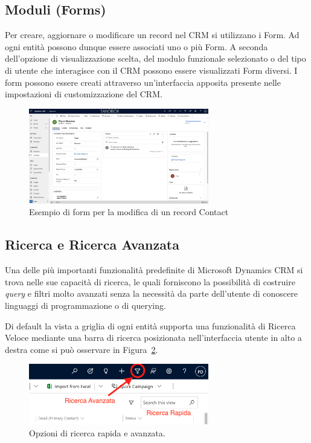 \subsection{Moduli (Forms)}
Per creare, aggiornare o modificare un record nel CRM si utilizzano i Form. Ad ogni entità possono dunque essere associati uno o più Form. A seconda dell'opzione di visualizzazione scelta, del modulo funzionale selezionato o del tipo di utente che interagisce con il CRM possono essere visualizzati Form diversi. 
I form possono essere creati attraverso un'interfaccia apposita presente nelle impostazioni di customizzazione del CRM.
\begin{figure}[ht!]
  \centering
  \includegraphics[width=0.7\textwidth]{form-example.png}
  \caption{Esempio di form per la modifica di un record Contact}
  \label{fig:formExample}
\end{figure}

\subsection{Ricerca e Ricerca Avanzata}
Una delle più importanti funzionalità predefinite di Microsoft Dynamics CRM si trova nelle sue capacità di ricerca, le quali forniscono la possibilità di costruire \textit{query} e filtri molto avanzati senza la necessità da parte dell'utente di conoscere linguaggi di programmazione o di querying.

Di default la vista a griglia di ogni entità supporta una funzionalità di Ricerca Veloce mediante una barra di ricerca posizionata nell'interfaccia utente in alto a destra come si può osservare in Figura~\ref{fig:quickSearch}.
\begin{figure}[ht]
  \centering
  \includegraphics[width=0.7\textwidth]{quick-search.png}
  \caption{Opzioni di ricerca rapida e avanzata.}
  \label{fig:quickSearch}
\end{figure}

